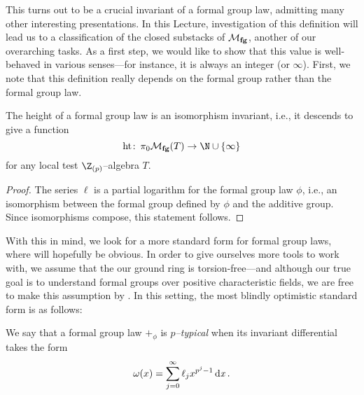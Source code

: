 This turns out to be a crucial invariant of a formal group law, admitting many other interesting presentations.  In this Lecture, investigation of this definition will lead us to a classification of the closed substacks of \(\mathcal{M}_{\mathbf{fg}}\), another of our overarching tasks.  As a first step, we would like to show that this value is well-behaved in various senses---for instance, it is always an integer (or \(\infty\)).  First, we note that this definition really depends on the formal group rather than the formal group law.

\begin{lemma}\label{HeightIsAnIsomInvariant}
The height of a formal group law is an isomorphism invariant, i.e., it descends to give a function \[\height\co \pi_0 \moduli{fg}(T) \to \N \cup \{\infty\}\] for any local test \(\Z_{(p)}\)--algebra \(T\).
\end{lemma}
\begin{proof}
The series \(\ell\) is a partial logarithm for the formal group law \(\phi\), i.e., an isomorphism between the formal group defined by \(\phi\) and the additive group.  Since isomorphisms compose, this statement follows.
\end{proof}

With this in mind, we look for a more standard form for formal group laws, where  will hopefully be obvious.  In order to give ourselves more tools to work with, we assume that the our ground ring is torsion-free---and although our true goal is to understand formal groups over positive characteristic fields, we are free to make this assumption by .  In this setting, the most blindly optimistic standard form is as follows:
\begin{definition}\label{DefnPTypInvDiffl}
We say that a formal group law \(+_\phi\) is \textit{\(p\)--typical} when its invariant differential takes the form \[\omega(x) = \sum_{j=0}^\infty \ell_j x^{p^j-1} \operatorname{d\mathit{x}}.\]
\end{definition}

